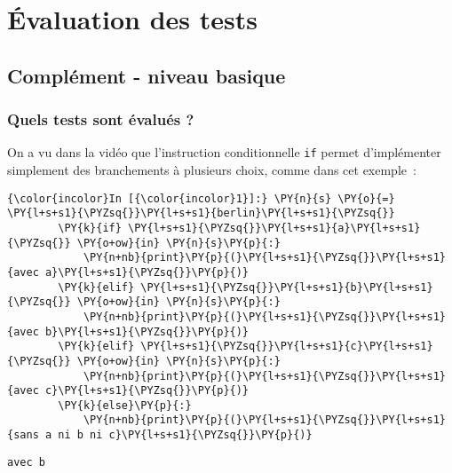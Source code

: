     
    
    
    

    

    \hypertarget{uxe9valuation-des-tests}{%
\section{Évaluation des tests}\label{uxe9valuation-des-tests}}

    \hypertarget{compluxe9ment---niveau-basique}{%
\subsection{Complément - niveau
basique}\label{compluxe9ment---niveau-basique}}

    \hypertarget{quels-tests-sont-uxe9valuuxe9s}{%
\subsubsection{Quels tests sont évalués
?}\label{quels-tests-sont-uxe9valuuxe9s}}

    On a vu dans la vidéo que l'instruction conditionnelle \texttt{if}
permet d'implémenter simplement des branchements à plusieurs choix,
comme dans cet exemple~:

    \begin{Verbatim}[commandchars=\\\{\}]
{\color{incolor}In [{\color{incolor}1}]:} \PY{n}{s} \PY{o}{=} \PY{l+s+s1}{\PYZsq{}}\PY{l+s+s1}{berlin}\PY{l+s+s1}{\PYZsq{}}
        \PY{k}{if} \PY{l+s+s1}{\PYZsq{}}\PY{l+s+s1}{a}\PY{l+s+s1}{\PYZsq{}} \PY{o+ow}{in} \PY{n}{s}\PY{p}{:}
            \PY{n+nb}{print}\PY{p}{(}\PY{l+s+s1}{\PYZsq{}}\PY{l+s+s1}{avec a}\PY{l+s+s1}{\PYZsq{}}\PY{p}{)}
        \PY{k}{elif} \PY{l+s+s1}{\PYZsq{}}\PY{l+s+s1}{b}\PY{l+s+s1}{\PYZsq{}} \PY{o+ow}{in} \PY{n}{s}\PY{p}{:}
            \PY{n+nb}{print}\PY{p}{(}\PY{l+s+s1}{\PYZsq{}}\PY{l+s+s1}{avec b}\PY{l+s+s1}{\PYZsq{}}\PY{p}{)}
        \PY{k}{elif} \PY{l+s+s1}{\PYZsq{}}\PY{l+s+s1}{c}\PY{l+s+s1}{\PYZsq{}} \PY{o+ow}{in} \PY{n}{s}\PY{p}{:}
            \PY{n+nb}{print}\PY{p}{(}\PY{l+s+s1}{\PYZsq{}}\PY{l+s+s1}{avec c}\PY{l+s+s1}{\PYZsq{}}\PY{p}{)}
        \PY{k}{else}\PY{p}{:}
            \PY{n+nb}{print}\PY{p}{(}\PY{l+s+s1}{\PYZsq{}}\PY{l+s+s1}{sans a ni b ni c}\PY{l+s+s1}{\PYZsq{}}\PY{p}{)}
\end{Verbatim}


    \begin{Verbatim}[commandchars=\\\{\}]
avec b

    \end{Verbatim}

